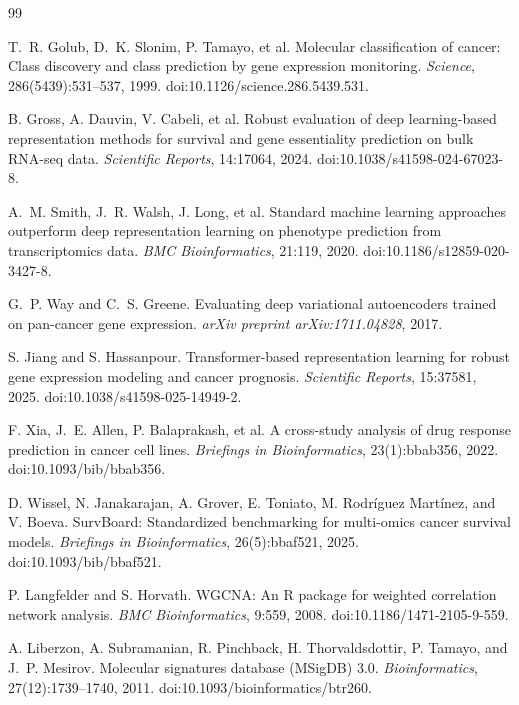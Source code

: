 \documentclass[11pt]{article}
\begin{document}
\begin{thebibliography}{99}

T.~R. Golub, D.~K. Slonim, P. Tamayo, et al.
\newblock Molecular classification of cancer: Class discovery and class
prediction by gene expression monitoring.
\newblock \emph{Science}, 286(5439):531--537, 1999.
\newblock doi:10.1126/science.286.5439.531.

B. Gross, A. Dauvin, V. Cabeli, et al.
\newblock Robust evaluation of deep learning-based representation methods for
survival and gene essentiality prediction on bulk RNA-seq data.
\newblock \emph{Scientific Reports}, 14:17064, 2024.
\newblock doi:10.1038/s41598-024-67023-8.

A.~M. Smith, J.~R. Walsh, J. Long, et al.
\newblock Standard machine learning approaches outperform deep representation
learning on phenotype prediction from transcriptomics data.
\newblock \emph{BMC Bioinformatics}, 21:119, 2020.
\newblock doi:10.1186/s12859-020-3427-8.

G.~P. Way and C.~S. Greene.
\newblock Evaluating deep variational autoencoders trained on pan-cancer gene
expression.
\newblock \emph{arXiv preprint arXiv:1711.04828}, 2017.

S. Jiang and S. Hassanpour.
\newblock Transformer-based representation learning for robust gene expression
modeling and cancer prognosis.
\newblock \emph{Scientific Reports}, 15:37581, 2025.
\newblock doi:10.1038/s41598-025-14949-2.

F. Xia, J.~E. Allen, P. Balaprakash, et al.
\newblock A cross-study analysis of drug response prediction in cancer cell
lines.
\newblock \emph{Briefings in Bioinformatics}, 23(1):bbab356, 2022.
\newblock doi:10.1093/bib/bbab356.

D. Wissel, N. Janakarajan, A. Grover, E. Toniato, M. Rodr\'iguez Mart\'inez,
and V. Boeva.
\newblock SurvBoard: Standardized benchmarking for multi-omics cancer survival
models.
\newblock \emph{Briefings in Bioinformatics}, 26(5):bbaf521, 2025.
\newblock doi:10.1093/bib/bbaf521.

P. Langfelder and S. Horvath.
\newblock WGCNA: An R package for weighted correlation network analysis.
\newblock \emph{BMC Bioinformatics}, 9:559, 2008.
\newblock doi:10.1186/1471-2105-9-559.

A. Liberzon, A. Subramanian, R. Pinchback, H. Thorvaldsdottir, P. Tamayo, and
J.~P. Mesirov.
\newblock Molecular signatures database (MSigDB) 3.0.
\newblock \emph{Bioinformatics}, 27(12):1739--1740, 2011.
\newblock doi:10.1093/bioinformatics/btr260.


\end{thebibliography}
\end{document}
